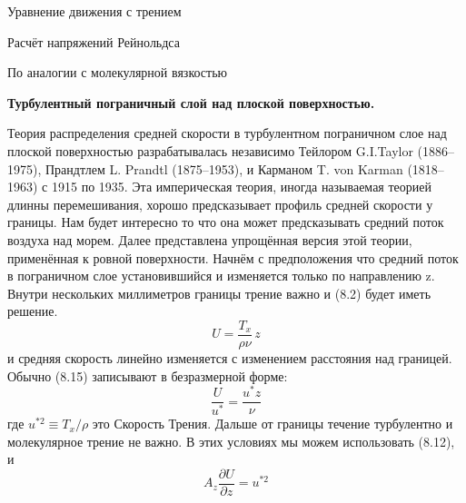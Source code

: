 \begin{chapter}{Уравнение движения с трением}
\begin{section}{Расчёт напряжений Рейнольдса}
\begin{paragraph}{По аналогии с молекулярной вязкостью}
\begin{center}
\textbf{Турбулентный пограничный слой над плоской поверхностью.}
\end{center}
Теория распределения средней скорости в турбулентном пограничном слое
над плоской поверхностью разрабатывалась независимо Тейлором
G.I.Taylor (1886--1975), Прандтлем L. Prandtl (1875--1953), и Карманом
T. von Karman (1818--1963) с 1915 по 1935. Эта империческая теория,
иногда называемая теорией длинны перемешивания, хорошо предсказывает
профиль средней скорости у границы. Нам будет интересно то что она
может предсказывать средний поток воздуха над морем. Далее
представлена упрощённая версия этой теории, применённая к ровной
поверхности. Начнём с предположения что средний поток в пограничном
слое установившийся и изменяется только по направлению z. Внутри
нескольких миллиметров границы трение важно и (8.2) будет иметь
решение.
\begin{equation}
U = \frac{T_x}{\rho \nu} \,z
\end{equation}
и средняя скорость линейно изменяется с изменением расстояния над
границей. Обычно (8.15) записывают в безразмерной форме:
\begin{equation}
\frac{U}{u^*} = \frac{u^* z}{\nu}
\end{equation}
где $u^{*2} \equiv T_x/\rho$ это Скорость Трения. Дальше от границы
течение турбулентно и молекулярное трение не важно. В этих условиях мы
можем использовать (8.12), и
\begin{equation}
A_z \frac{\partial U}{\partial z} = u^{*2}
\end{equation}
%

\end{paragraph}
\end{section}
\end{chapter}
